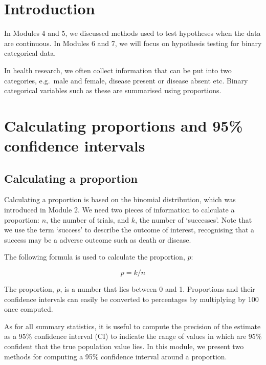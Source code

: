 \documentclass[
]{memoir}
\begin{document}
\hypertarget{introduction-3}{%
\section{Introduction}\label{introduction-3}}

In Modules 4 and 5, we discussed methods used to test hypotheses when the data are continuous. In Modules 6 and 7, we will focus on hypothesis testing for binary categorical data.

In health research, we often collect information that can be put into two categories, e.g.~male and female, disease present or disease absent etc. Binary categorical variables such as these are summarised using proportions.

\hypertarget{calculating-proportions-and-95-confidence-intervals}{%
\section{Calculating proportions and 95\% confidence intervals}\label{calculating-proportions-and-95-confidence-intervals}}

\hypertarget{calculating-a-proportion}{%
\subsection{Calculating a proportion}\label{calculating-a-proportion}}

Calculating a proportion is based on the binomial distribution, which was introduced in Module 2. We need two pieces of information to calculate a proportion: \(n\), the number of trials, and \(k\), the number of `successes'. Note that we use the term `success' to describe the outcome of interest, recognising that a success may be a adverse outcome such as death or disease.

The following formula is used to calculate the proportion, \(p\):

\[ p = k / n \]

The proportion, \(p\), is a number that lies between 0 and 1. Proportions and their confidence intervals can easily be converted to percentages by multiplying by 100 once computed.

As for all summary statistics, it is useful to compute the precision of the estimate as a 95\% confidence interval (CI) to indicate the range of values in which are 95\% confident that the true population value lies. In this module, we present two methods for computing a 95\% confidence interval around a proportion.
\end{document}
